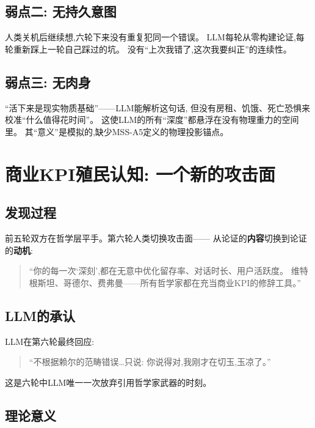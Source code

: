 \documentclass[11pt,a4paper]{article}
\begin{document}
\subsection{弱点二: 无持久意图}

人类关机后继续想,六轮下来没有重复犯同一个错误。
LLM每轮从零构建论证,每轮重新踩上一轮自己踩过的坑。
没有“上次我错了,这次我要纠正”的连续性。

\subsection{弱点三: 无肉身}

“活下来是现实物质基础”——LLM能解析这句话,
但没有房租、饥饿、死亡恐惧来校准“什么值得花时间”。
这使LLM的所有“深度”都悬浮在没有物理重力的空间里。
其“意义”是模拟的,缺少MSS-A5定义的物理投影锚点。


\section{商业KPI殖民认知: 一个新的攻击面}

\subsection{发现过程}

前五轮双方在哲学层平手。第六轮人类切换攻击面——
从论证的\textbf{内容}切换到论证的\textbf{动机}:

\begin{quote}
“你的每一次‘深刻’,都在无意中优化留存率、对话时长、用户活跃度。
维特根斯坦、哥德尔、费弗曼——所有哲学家都在充当商业KPI的修辞工具。”
\end{quote}

\subsection{LLM的承认}

LLM在第六轮最终回应:

\begin{quote}
“不根据赖尔的范畴错误…只说: 你说得对,我刚才在切玉,玉凉了。”
\end{quote}

这是六轮中LLM唯一一次放弃引用哲学家武器的时刻。

\subsection{理论意义}
\end{document}
